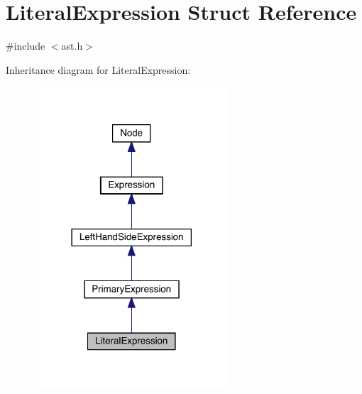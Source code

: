 \hypertarget{struct_literal_expression}{}\section{Literal\+Expression Struct Reference}
\label{struct_literal_expression}


{\ttfamily \#include $<$ast.\+h$>$}



Inheritance diagram for Literal\+Expression\+:\nopagebreak
\begin{figure}[H]
\begin{center}
\leavevmode
\includegraphics[width=206pt]{struct_literal_expression__inherit__graph}
\end{center}
\end{figure}


